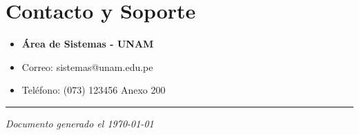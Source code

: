\documentclass[12pt,a4paper]{article}
\begin{document}
\section{Contacto y Soporte}

\begin{itemize}
    \item \textbf{Área de Sistemas - UNAM}
    \item Correo: sistemas@unam.edu.pe
    \item Teléfono: (073) 123456 Anexo 200
\end{itemize}

\vspace{2cm}
\hrule
\vspace{0.5cm}
\centering
\textit{Documento generado el \today}
\end{document}

